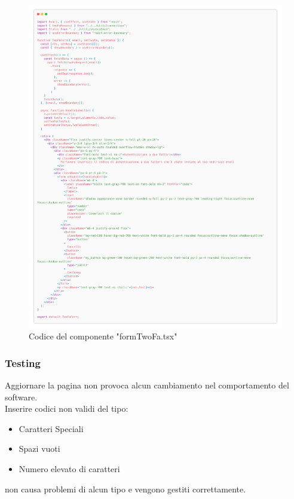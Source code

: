 \documentclass{report}
\begin{document}
\begin{itemize}
\begin{itemize}
\begin{figure}[H]
			\centering\includegraphics[width=1\textwidth]{images/microservizio-autenticazione/frontend/formTwoFa-carbon.png}
			Codice del componente "formTwoFa.tsx"
		\end{figure}
	\end{itemize}
\end{itemize}

\subsubsection*{Testing}
Aggiornare la pagina non provoca alcun cambiamento nel comportamento del software.\\Inserire codici non validi del tipo:
\begin{itemize}
	\item Caratteri Speciali
	\item Spazi vuoti
	\item Numero elevato di caratteri
\end{itemize}
non causa problemi di alcun tipo e vengono gestiti correttamente.
\end{document}
